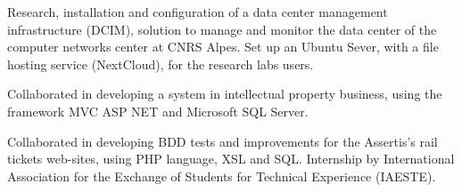 \documentclass[9pt,a4paper]{altacv}
\begin{document}

\begin{fullwidth}
\makecvheader
\end{fullwidth}



Research, installation and configuration of a data center management infrastructure (DCIM), solution to manage and monitor the data center of the computer networks center at CNRS Alpes. Set up an Ubuntu Sever, with a file hosting service (NextCloud), for the research labs users. 

\divider


Collaborated in developing a system in intellectual property business, using the framework MVC ASP NET and Microsoft SQL Server. 

\divider


Collaborated in developing BDD tests and improvements for the Assertis’s rail tickets web-sites, using PHP language, XSL and SQL. Internship by International Association for the Exchange of Students for Technical Experience (IAESTE).
\end{document}
